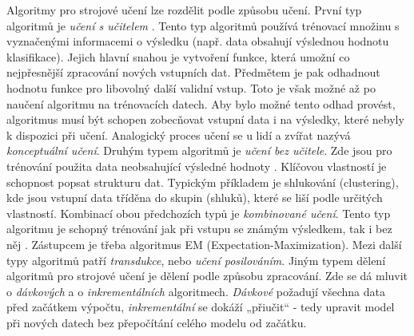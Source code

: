 \documentclass[12pt]{article}
\begin{document}
Algoritmy pro strojové učení lze rozdělit podle způsobu učení. První
typ algoritmů je \textit{učení s učitelem} \citep{MR2350486}. Tento typ algoritmů používá trénovací množinu s vyznačenými informacemi o výsledku (např. data obsahují výslednou hodnotu klasifikace). Jejich hlavní snahou je vytvoření funkce, která umožní co nejpřesnější zpracování nových vstupních dat. Předmětem je pak odhadnout hodnotu funkce pro libovolný další validní vstup. Toto je však možné až po naučení algoritmu na trénovacích datech. Aby bylo možné tento odhad provést, algoritmus musí být schopen zobecňovat vstupní data i na výsledky, které nebyly k dispozici při učení. Analogický proces učení se u lidí a zvířat nazývá \textit{konceptuální učení}.
\newline
\indent Druhým typem algoritmů je \textit{učení bez učitele}. Zde jsou pro trénování použita data neobsahující výsledné hodnoty \citep{sejn}. Klíčovou vlastností je schopnost popsat strukturu dat. Typickým příkladem je shlukování (clustering), kde jsou vstupní data tříděna do skupin (shluků), které se liší podle určitých vlastností.
\newline
\indent Kombinací obou předchozích typů je \textit{kombinované učení}. Tento typ algoritmu je schopný trénování jak při vstupu se známým výsledkem, tak i bez něj \citep{chapelle}. Zástupcem je třeba algoritmus EM (Expectation-Maximization).
Mezi další typy algoritmů patří \textit{transdukce}, nebo \textit{učení posilováním}.
\newline
\indent Jiným typem dělení algoritmů pro strojové učení je dělení podle způsobu zpracování. Zde se dá mluvit o \textit{dávkových} a o \textit{inkrementálních} algoritmech. \textit{Dávkové} požadují všechna data před začátkem výpočtu, \textit{inkrementální} se dokáží „přiučit“ - tedy upravit model při nových datech bez přepočítání celého modelu od začátku.
\end{document}
